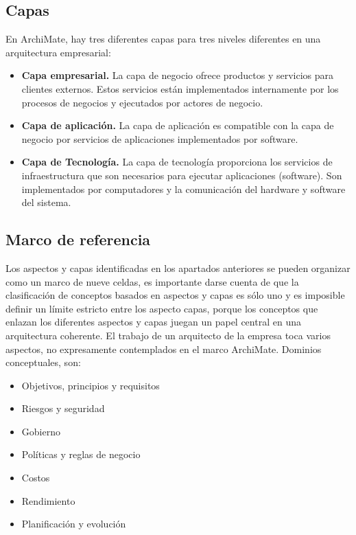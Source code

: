   \subsection{Capas}
  En ArchiMate, hay tres diferentes capas para tres niveles diferentes en una arquitectura empresarial: \\
  \begin{itemize}
  	\item \textbf{Capa empresarial.} La capa de negocio ofrece productos y servicios para clientes externos. Estos servicios están implementados internamente por los procesos de negocios y ejecutados por actores de negocio.
  	\item \textbf{Capa de aplicación.} La capa de aplicación es compatible con la capa de negocio por servicios de aplicaciones implementados por software.
  	\item \textbf{Capa de Tecnología.}  La capa de tecnología proporciona los servicios de infraestructura que son necesarios para ejecutar aplicaciones (software). Son implementados por computadores y la comunicación del hardware y software del sistema.
  \end{itemize}
  
  \subsection{Marco de referencia}
Los aspectos y capas identificadas en los apartados anteriores se pueden organizar como un marco de nueve celdas, es importante darse cuenta de que la clasificación de conceptos basados en aspectos y capas es sólo uno y es imposible definir un límite estricto entre los aspecto capas, porque los conceptos que enlazan los diferentes aspectos y capas juegan un papel central en una arquitectura coherente. El trabajo de un arquitecto de la empresa toca varios aspectos, no expresamente contemplados en el marco ArchiMate. Dominios conceptuales, son:
  \begin{itemize}
  	\item Objetivos, principios y requisitos
  	\item Riesgos y seguridad
  	\item Gobierno
  	\item Políticas y reglas de negocio
  	\item Costos
  	\item Rendimiento
  	\item Planificación y evolución
  \end{itemize}
  
